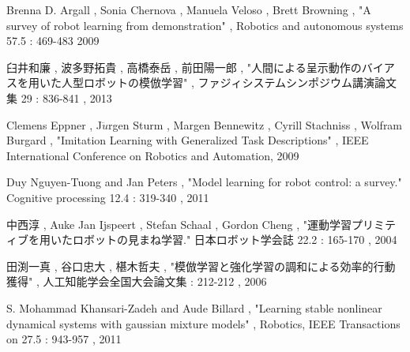 \begin{thebibliography}{99}
Brenna D. Argall , Sonia Chernova , Manuela Veloso , Brett Browning , "A survey of robot learning from demonstration" , Robotics and autonomous systems 57.5 : 469-483 2009

臼井和廉 , 波多野拓貴 , 高橋泰岳 , 前田陽一郎 , "人間による呈示動作のバイアスを用いた人型ロボットの模倣学習" , ファジィシステムシンポジウム講演論文集 29 : 836-841 , 2013

Clemens Eppner , J$\ddot{u}$rgen Sturm , Margen Bennewitz , Cyrill Stachniss , Wolfram Burgard , "Imitation Learning with Generalized Task Descriptions" , IEEE International Conference on Robotics and Automation, 2009

Duy Nguyen-Tuong  and Jan Peters , "Model learning for robot control: a survey." Cognitive processing 12.4 : 319-340 , 2011

中西淳 , Auke Jan Ijspeert , Stefan Schaal , Gordon Cheng , "運動学習プリミティブを用いたロボットの見まね学習." 日本ロボット学会誌 22.2 : 165-170 , 2004

田渕一真 , 谷口忠大 , 椹木哲夫 , "模倣学習と強化学習の調和による効率的行動獲得" , 人工知能学会全国大会論文集 : 212-212 , 2006

S. Mohammad Khansari-Zadeh and Aude Billard , "Learning stable nonlinear dynamical systems with gaussian mixture models" , Robotics, IEEE Transactions on 27.5 : 943-957 , 2011

\end{thebibliography}


